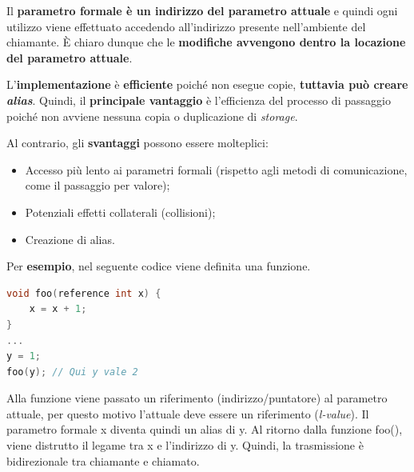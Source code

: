 \documentclass[a4paper]{article}
\begin{document}
	\noindent
	Il \textbf{parametro formale è un indirizzo del parametro attuale} e quindi ogni utilizzo viene effettuato accedendo all'indirizzo presente nell'ambiente del chiamante. È chiaro dunque che le \textbf{modifiche avvengono dentro la locazione del parametro attuale}.\newline
	
	\noindent
	L'\textbf{implementazione} è \textbf{efficiente} poiché non esegue copie, \textbf{tuttavia può creare \emph{alias}}. Quindi, il \textcolor{Green4}{\textbf{principale vantaggio}} è l'efficienza del processo di passaggio poiché non avviene nessuna copia o duplicazione di \emph{storage}.\newline
	
	\noindent
	Al contrario, gli \textcolor{Red3}{\textbf{svantaggi}} possono essere molteplici:
	\begin{itemize}
		\item Accesso più lento ai parametri formali (rispetto agli metodi di comunicazione, come il passaggio per valore);
		
		\item Potenziali effetti collaterali (collisioni);
		
		\item Creazione di alias.
	\end{itemize}
	Per \textcolor{Green4}{\textbf{esempio}}, nel seguente codice viene definita una funzione.
	\begin{lstlisting}[language=C]
void foo(reference int x) {
	x = x + 1;
}
...
y = 1;
foo(y); // Qui y vale 2\end{lstlisting}
	Alla funzione viene passato un riferimento (indirizzo/puntatore) al parametro attuale, per questo motivo l'attuale deve essere un riferimento (\emph{l-value}). Il parametro formale \textsf{x} diventa quindi un alias di \textsf{y}. Al ritorno dalla funzione \textsf{foo()}, viene distrutto il legame tra \textsf{x} e l'indirizzo di \textsf{y}. Quindi, la trasmissione è bidirezionale tra chiamante e chiamato.\newpage
	
\end{document}
